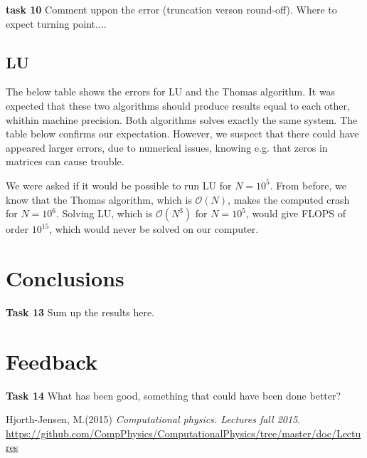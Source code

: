 \documentclass{article}
\begin{document}
\textbf{task 10} Comment uppon the error (truncation verson round-off). Where to expect turning point....

\subsection{LU}
The below table shows the errors for LU and the Thomas algorithm. It was expected that these two algorithms should produce results equal to each other, whithin machine precision. Both algorithms solves exactly the same system. The table below confirms our expectation. However, we suspect that there could have appeared larger errors, due to numerical issues, knowing e.g. that zeros in matrices can cause trouble.

\begin{minipage}{.49\textwidth} %
	
\end{minipage}\hfill
\begin{minipage}{.49\textwidth}
	
\end{minipage}\hfill


We were asked if it would be possible to run LU for $N=10^5.$ From before, we know that the Thomas algorithm, which is $\mathcal{O}(N)$, makes the computed crash for $N = 10^6$. Solving LU, which is $\mathcal{O}(N^3)$ for $N = 10^5$, would give FLOPS of order $10^15$, which would never be solved on our computer.

\section{Conclusions}
\textbf{Task 13} Sum up the results here.

\section{Feedback}
\textbf{Task 14} What has been good, something that could have been done better?

\begin{thebibliography}{9}
	Hjorth-Jensen, M.(2015)
	\textit{Computational physics. Lectures fall 2015}. 
	\url{https://github.com/CompPhysics/ComputationalPhysics/tree/master/doc/Lectures}
\end{thebibliography}
\end{document}
